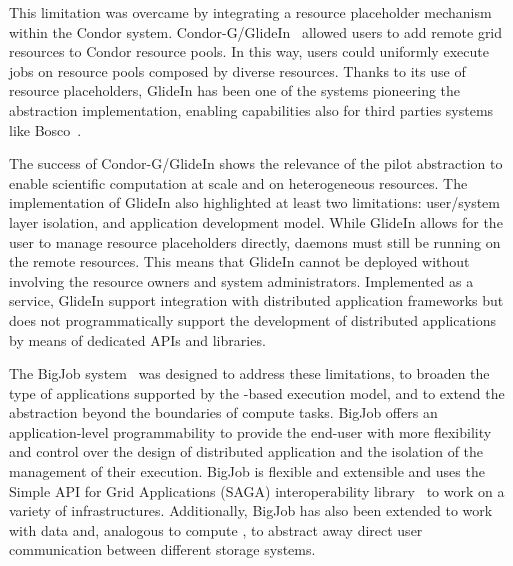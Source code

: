 \documentclass{sig-alternate}
\begin{document}
This limitation was overcame by integrating a resource placeholder mechanism
within the Condor system. Condor-G/GlideIn~\cite{condor-g} allowed users to add
remote grid resources to Condor resource pools. In this way, users could
uniformly execute jobs on resource pools composed by diverse resources. Thanks
to its use of resource placeholders, GlideIn has been one of the systems
pioneering the \pilot abstraction implementation, enabling \pilot capabilities
also for third parties systems like Bosco~\cite{bosco}.  

The success of Condor-G/GlideIn shows the relevance of the pilot abstraction to
enable scientific computation at scale and on heterogeneous resources. The
implementation of GlideIn also highlighted at least two limitations: user/system
layer isolation, and application development model. While GlideIn allows for the
user to manage resource placeholders directly, daemons must still be running on
the remote resources. This means that GlideIn cannot be deployed without
involving the resource owners and system administrators. Implemented as a
service, GlideIn support integration with distributed application frameworks but
does not programmatically support the development of distributed applications by
means of dedicated APIs and libraries. 

The BigJob \pilot system~\cite{luckow2010} was designed to address these
limitations, to broaden the type of applications supported by the \pilot-based
execution model, and to extend the \pilot abstraction beyond the boundaries of
compute tasks.  BigJob offers an application-level programmability to provide
the end-user with more flexibility and control over the design of distributed
application and the isolation of the management of their execution. BigJob is
flexible and extensible and uses the Simple API for Grid Applications (SAGA)
interoperability library~\cite{goodale2006,luckow2010} to work on a variety of
infrastructures.  Additionally, BigJob has also been extended to work with data
and, analogous to compute \pilots, to abstract away direct user communication
between different storage systems.

\end{document}
